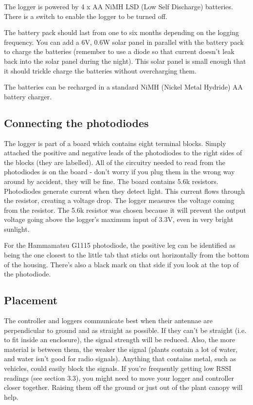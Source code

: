 \documentclass[10pt]{article}
\begin{document}
The logger is powered by 4 x AA NiMH LSD (Low Self Discharge) batteries. There is a switch to enable the logger to be turned off.

The battery pack should last from one to six months depending on the logging frequency. You can add a 6V, 0.6W solar panel in parallel with the battery pack to charge the batteries (remember to use a diode so that current doesn't leak back into the solar panel during the night). This solar panel is small enough that it should trickle charge the batteries without overcharging them.

The batteries can be recharged in a standard NiMH (Nickel Metal Hydride) AA battery charger.

\subsection{Connecting the photodiodes}

The logger is part of a board which contains eight terminal blocks. Simply attached the positive and negative leads of the photodiodes to the right sides of the blocks (they are labelled). All of the circuitry needed to read from the photodiodes is on the board - don't worry if you plug them in the wrong way around by accident, they will be fine. The board contains 5.6k resistors. Photodiodes generate current when they detect light. This current flows through the resistor, creating a voltage drop. The logger measures the voltage coming from the resistor. The 5.6k resistor was chosen because it will prevent the output voltage going above the logger's maximum input of 3.3V, even in very bright sunlight.

For the Hammamatsu G1115 photodiode, the positive leg can be identified as being the one closest to the little tab that sticks out horizontally from the bottom of the housing. There's also a black mark on that side if you look at the top of the photodiode.

\subsection{Placement}

The controller and loggers communicate best when their antennae are perpendicular to ground and as straight as possible. If they can't be straight (i.e. to fit inside an enclosure), the signal strength will be reduced. Also, the more material is between them, the weaker the signal (plants contain a lot of water, and water isn't good for radio signals). Anything that contains metal, such as vehicles, could easily block the signals. If you're frequently getting low RSSI readings (see section 3.3), you might need to move your logger and controller closer together. Raising them off the ground or just out of the plant canopy will help.
\end{document}
